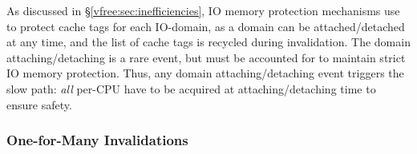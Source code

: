 

As discussed in \S\ref{vfree:sec:inefficiencies}, IO memory protection mechanisms 
    use  to protect cache tags for each IO-domain, as
    a domain can be attached/detached at any time, and the list of cache tags is recycled during invalidation.
The domain attaching/detaching is a rare event, but must be accounted for to maintain strict IO memory protection. 
Thus, any domain attaching/detaching event triggers the slow path: \emph{all} per-CPU  
    have to be acquired at attaching/detaching time to ensure safety.

\subsubsection{One-for-Many Invalidations}
\label{vfree:ssec:one-to-many}

